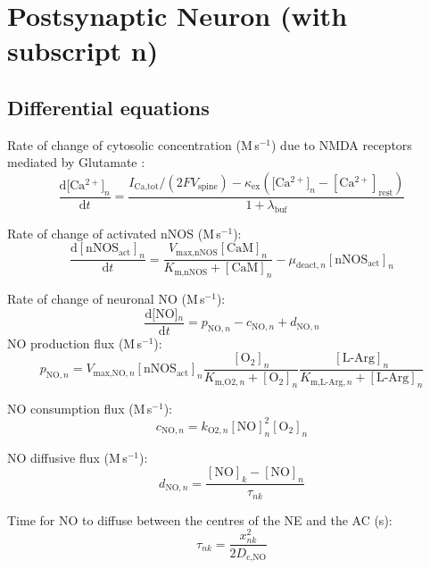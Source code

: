 \documentclass[fleqn]{report}
\numberwithin{equation}{section}
\numberwithin{equation}{section}
\newcommand{\NO}{\text{NO}}
\newcommand{\nNOSact}{\text{nNOS$_{\text{act}}$}}
\newcommand{\LArg}{\text{L-Arg}}
\newcommand{\Otwo}{\text{O$_2$}}
\newcommand{\Ca}{\text{Ca$^{2+}$}}
\newcommand{\Can}{\text{[Ca$^{2+}]_n$}}
\newcommand{\NOn}{\text{[NO]$_n$}}
\newcommand{\uMpers}{\textmu M\,s$^{-1}$}
\newcommand\pNO[1]{\text{$p_{\text{NO},#1}$}}
\newcommand\cNO[1]{\text{$c_{\text{NO},#1}$}}
\newcommand\dNO[1]{\text{$d_{\text{NO},#1}$}}
\begin{document}
		\section{Postsynaptic Neuron (with subscript n)}
		\subsection*{Differential equations}
					Rate of change of cytosolic \Ca concentration (\uMpers) due to NMDA receptors mediated by Glutamate : 
					\begin{equation}       
						\dfrac{\mathrm{d}\Can}{\mathrm{d}t} = \frac{I_{\text{Ca,tot}}/(2FV_{\text{spine}}) - \kappa_{\text{ex}}(\Can - [\Ca]_{\text{rest}})}{1 + \lambda_{\text{buf}}} 
					\end{equation}
					   
					Rate of change of activated nNOS (\uMpers):
		       		\begin{equation}  
		       			\dfrac{\mathrm{d}[\nNOSact]_n}{\mathrm{d}t} = \frac{V_{\text{max,nNOS}} [\text{CaM}]_n}{K_{\text{m,nNOS}}+[\text{CaM}]_n}-\mu_{\text{deact},n} [\nNOSact]_n
					\end{equation} 
					         			
					Rate of change of neuronal NO (\uMpers):
		       		\begin{equation}  
		       			 \dfrac{\mathrm{d}\NOn}{\mathrm{d}t} = \pNO{n} - \cNO{n} + \dNO{n}
					\end{equation}          			
							NO production flux (\uMpers): 	
							\begin{equation} 
								\pNO{n} = V_{\text{max,NO},n} [\nNOSact]_n \frac{[\Otwo]_n}{K_{\text{m,O2},n}+[\Otwo]_n} \frac{[\LArg]_n}{K_{\text{m,L-Arg},n}+[\LArg]_n}
							\end{equation}	
								
							NO consumption flux (\uMpers): 				
							\begin{equation} 
								\cNO{n} = k_{\text{O2},n} [\NO]_n^2 [\Otwo]_n
							\end{equation}
							
							NO diffusive flux (\uMpers): 	
							\begin{equation} 
								\dNO{n} = \frac{[\NO]_k - [\NO]_n}{\tau_{nk}}
							\end{equation}	
									
							Time for NO to diffuse between the centres of the NE and the AC (s):
							\begin{equation}
								\tau_{nk} = \frac{x_{nk}^2}{2 D_{\text{c,NO}}}
							\end{equation}
							
\end{document}
